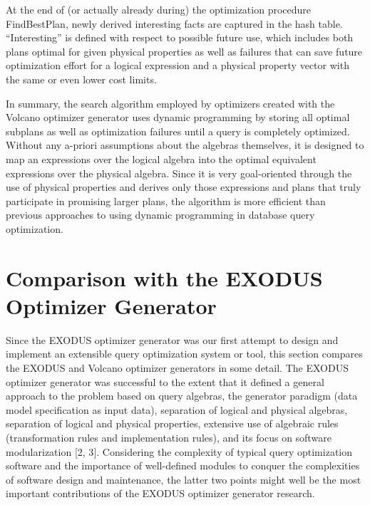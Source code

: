 \documentclass[a4paper,12pt,notitlepage,twoside,openright]{article}
\begin{document}
At the end of (or actually already during) the optimization procedure
FindBestPlan, newly derived interesting facts are captured in the hash
table. ``Interesting'' is defined with respect to possible future use,
which includes both plans optimal for given physical properties as well
as failures that can save future optimization effort for a logical
expression and a physical property vector with the same or even lower
cost limits.

In summary, the search algorithm employed by optimizers created with the
Volcano optimizer generator uses dynamic programming by storing all
optimal subplans as well as optimization failures until a query is
completely optimized. Without any a-priori assumptions about the
algebras themselves, it is designed to map an expressions over the
logical algebra into the optimal equivalent expressions over the
physical algebra. Since it is very goal-oriented through the use of
physical properties and derives only those expressions and plans that
truly participate in promising larger plans, the algorithm is more
efficient than previous approaches to using dynamic programming in
database query optimization.

\hypertarget{comparison-with-the-exodus-optimizer-generator}{%
\section{Comparison with the EXODUS Optimizer
Generator}\label{comparison-with-the-exodus-optimizer-generator}}

Since
the EXODUS optimizer generator was our first attempt to design and
implement an extensible query optimization system or tool, this section
compares the EXODUS and Volcano optimizer generators in some detail. The
EXODUS optimizer generator was successful to the extent that it defined
a general approach to the problem based on query algebras, the generator
paradigm (data model specification as input data), separation of logical
and physical algebras, separation of logical and physical properties,
extensive use of algebraic rules (transformation rules and
implementation rules), and its focus on software modularization {[}2,
3{]}. Considering the complexity of typical query optimization software
and the importance of well-defined modules to conquer the complexities
of software design and maintenance, the latter two points might well be
the most important contributions of the EXODUS optimizer generator
research.
\end{document}
